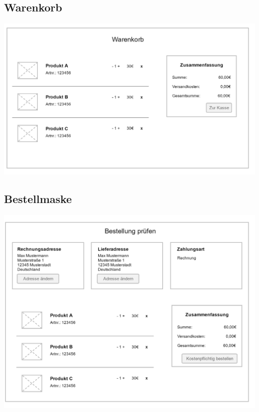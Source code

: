 \subsection{Warenkorb}
\includegraphics[width=\linewidth]{anhang/webshop_cart.png}


\subsection{Bestellmaske}
\includegraphics[width=\linewidth]{anhang/webshop_checkout.png}
